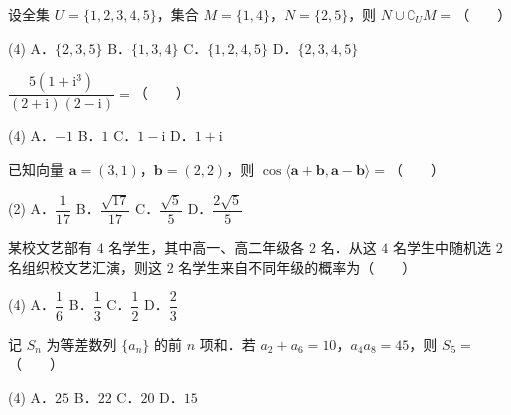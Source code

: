 

\par\medskip


\begin{question}
设全集 $U=\{1,2,3,4,5\}$，集合 $M=\{1,4\}$，$N=\{2,5\}$，则 $N\cup\complement_U M=$\mbox{（　　）}

\begin{gkopts}(4)
\task A．$\{2,3,5\}$
\task B．$\{1,3,4\}$
\task C．$\{1,2,4,5\}$
\task D．$\{2,3,4,5\}$
\end{gkopts}

\end{question}
\begin{question}
$\dfrac{5(1+\mathrm i^3)}{(2+\mathrm i)(2-\mathrm i)}=$\mbox{（　　）}

\begin{gkopts}(4)
\task A．$-1$
\task B．$1$
\task C．$1-\mathrm i$
\task D．$1+\mathrm i$
\end{gkopts}

\end{question}
\begin{question}
已知向量 $\boldsymbol a=(3,1)$，$\boldsymbol b=(2,2)$，则 $\cos\langle\boldsymbol a+\boldsymbol b,\boldsymbol a-\boldsymbol b\rangle=$\mbox{（　　）}

\begin{gkopts}(2)
\task A．$\dfrac1{17}$
\task B．$\dfrac{\sqrt{17}}{17}$
\task C．$\dfrac{\sqrt5}{5}$
\task D．$\dfrac{2\sqrt5}{5}$
\end{gkopts}

\end{question}
\begin{question}
某校文艺部有 $4$ 名学生，其中高一、高二年级各 $2$ 名．从这 $4$ 名学生中随机选 $2$ 名组织校文艺汇演，则这 $2$ 名学生来自不同年级的概率为\mbox{（　　）}

\begin{gkopts}(4)
\task A．$\dfrac16$
\task B．$\dfrac13$
\task C．$\dfrac12$
\task D．$\dfrac23$
\end{gkopts}

\end{question}
\begin{question}
记 $S_n$ 为等差数列 $\{a_n\}$ 的前 $n$ 项和．若 $a_2+a_6=10$，$a_4a_8=45$，则 $S_5=$\mbox{（　　）}

\begin{gkopts}(4)
\task A．$25$
\task B．$22$
\task C．$20$
\task D．$15$
\end{gkopts}

\Needspace{0.4\textheight}
\end{question}
